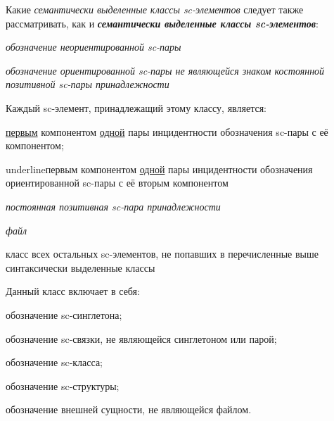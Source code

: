 Какие \textit{семантически выделенные классы sc-элементов} следует также рассматривать, как и \textbf{\textit{семантически выделенные классы sc-элементов}}:
\begin{textitemize}
	\item \textit{обозначение неориентированной sc-пары}\\
	\item \textit{обозначение ориентированной sc-пары не являющейся знаком костоянной позитивной sc-пары принадлежности}\\
	{Каждый sc-элемент, принадлежащий этому классу, является:
		\begin{textitemize}
			\item \underline{первым} компонентом \underline{одной} пары инцидентности обозначения sc-пары с её компонентом;
			\item underline{первым} компонентом \underline{одной} пары инцидентности обозначения ориентированной sc-пары с её вторым компонентом
		\end{textitemize}
	}
	\item \textit{постоянная позитивная sc-пара принадлежности}\\
	\item \textit{файл}\\
	\item класс всех остальных sc-элементов, не попавших в перечисленные выше синтаксически выделенные классы\\
	{Данный класс включает в себя:
		\begin{textitemize}
			\item обозначение sc-синглетона;
			\item обозначение sc-связки, не являющейся синглетоном или парой;
			\item обозначение sc-класса;
			\item обозначение sc-структуры;
			\item обозначение внешней сущности, не являющейся файлом.
		\end{textitemize}
	}
\end{textitemize}

